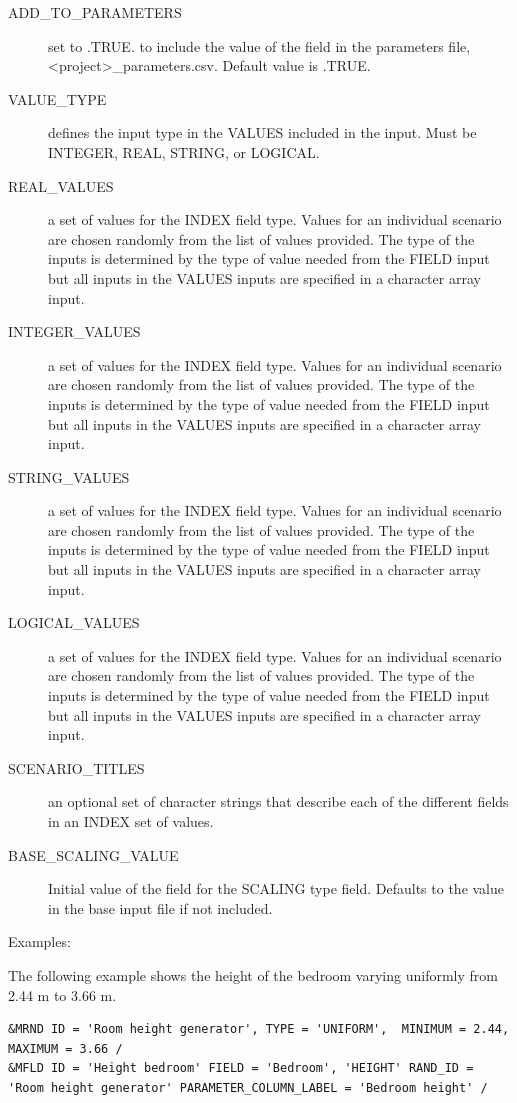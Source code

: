 \documentclass[12pt,twoside]{book}
\begin{document}
\begin{description}
  \item[ADD\_TO\_PARAMETERS] set to .TRUE. to include the value of the field in the parameters file, {\ct <project>\_parameters.csv}. Default value is .TRUE.
  \item[VALUE\_TYPE] defines the input type in the {\ct VALUES} included in the input. Must be {\ct INTEGER}, {\ct REAL}, {\ct STRING}, or {\ct LOGICAL}.
  \item[REAL\_VALUES] a set of values for the {\ct INDEX} field type. Values for an individual scenario are chosen randomly from the list of values provided. The type of the inputs is determined by the type of value needed from the {\ct FIELD} input but all inputs in the {\ct VALUES} inputs are specified in a character array input.
  \item[INTEGER\_VALUES] a set of values for the {\ct INDEX} field type. Values for an individual scenario are chosen randomly from the list of values provided. The type of the inputs is determined by the type of value needed from the {\ct FIELD} input but all inputs in the {\ct VALUES} inputs are specified in a character array input.
  \item[STRING\_VALUES] a set of values for the {\ct INDEX} field type. Values for an individual scenario are chosen randomly from the list of values provided. The type of the inputs is determined by the type of value needed from the {\ct FIELD} input but all inputs in the {\ct VALUES} inputs are specified in a character array input.
  \item[LOGICAL\_VALUES] a set of values for the {\ct INDEX} field type. Values for an individual scenario are chosen randomly from the list of values provided. The type of the inputs is determined by the type of value needed from the {\ct FIELD} input but all inputs in the {\ct VALUES} inputs are specified in a character array input.
  \item[SCENARIO\_TITLES] an optional set of character strings that describe each of the different fields in an {\ct INDEX} set of values.
  \item[BASE\_SCALING\_VALUE] Initial value of the field for the {\ct SCALING} type field. Defaults to the value in the base input file if not included.
\end{description}

\vspace{\baselineskip}
\noindent Examples:

The following example shows the height of the bedroom varying uniformly from 2.44 m to 3.66 m.
\begin{lstlisting}[language=cdata, basicstyle=\scriptsize]
&MRND ID = 'Room height generator', TYPE = 'UNIFORM',  MINIMUM = 2.44, MAXIMUM = 3.66 /
&MFLD ID = 'Height bedroom' FIELD = 'Bedroom', 'HEIGHT' RAND_ID = 'Room height generator' PARAMETER_COLUMN_LABEL = 'Bedroom height' /
\end{lstlisting}
\end{document}
